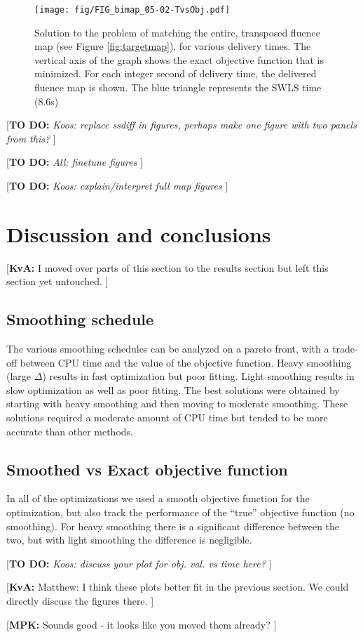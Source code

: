 \documentclass{iopart}
\newcommand{\todo}[1]{{\color{lightblue}\par {[{\bf TO DO: } {\em #1}} ] \\    }}
\newcommand{\MPKcomment}[1]{{\color{magenta}\par {[{\bf MPK: } { #1}} ] \\    }}
\newcommand{\KvAcomment}[1]{{\color{magenta}\par {[{\bf KvA: } { #1}} ] \\    }}
\begin{document}
\begin{figure}
  \centering
  \texttt{[image: fig/FIG\_bimap\_05-02-TvsObj.pdf]}
  \caption{Solution to the problem of matching the entire, transposed fluence map (see Figure \ref{fig:targetmap}), for various delivery times. The vertical axis of the graph shows the exact objective function that is minimized. For each integer second of delivery time, the delivered fluence map is shown. The blue triangle represents the SWLS time (8.6s)}
  \label{fig:TvsObj_bestalpha_bi}
\end{figure}
\todo{Koos: replace ssdiff in figures, perhaps make one figure with two panels from this?}

\todo{All: finetune figures}
\todo{Koos: explain/interpret full map figures}

\section{Discussion and conclusions}
\KvAcomment{I moved over parts of this section to the results section but left this section yet untouched.}
\subsection{Smoothing schedule}

The various smoothing schedules can be analyzed on a pareto front, with a trade-off between CPU time and the value of the objective function. Heavy smoothing (large $\Delta$) results in fast optimization but poor fitting. Light smoothing results in slow optimization as well as poor fitting. The best solutions were obtained by starting with heavy smoothing and then moving to moderate smoothing. These solutions required a moderate amount of CPU time but tended to be more accurate than other methods.

\subsection{Smoothed vs Exact objective function}

In all of the optimizations we used a smooth objective function for the optimization, but also track the performance of the ``true'' objective function (no smoothing). For heavy smoothing there is a significant difference between the two, but with light smoothing the difference is negligible.

\todo{Koos: discuss your plot for obj. val. vs time here?}
\KvAcomment{Matthew: I think these plots better fit in the previous section. We could directly discuss the figures there.}
\MPKcomment{Sounds good - it looks like you moved them already?}
\end{document}

